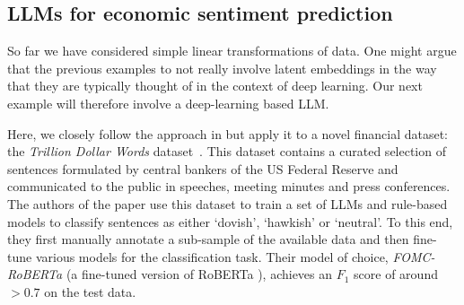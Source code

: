 \documentclass{article}
\theoremstyle{plain}
\theoremstyle{definition}
\theoremstyle{remark}
\begin{document}

% 

\subsection{LLMs for economic sentiment prediction}\label{ex-llm}

So far we have considered simple linear transformations of data. One might argue that the previous examples to not really involve latent embeddings in the way that they are typically thought of in the context of deep learning. Our next example will therefore involve a deep-learning based LLM.

Here, we closely follow the approach in \citet{gurnee2023languagev2} but apply it to a novel financial dataset: the \emph{Trillion Dollar Words} dataset~\cite{shah2023trillion}. This dataset contains a curated selection of sentences formulated by central bankers of the US Federal Reserve and communicated to the public in speeches, meeting minutes and press conferences. The authors of the paper use this dataset to train a set of LLMs and rule-based models to classify sentences as either `dovish', `hawkish' or `neutral'. To this end, they first manually annotate a sub-sample of the available data and then fine-tune various models for the classification task. Their model of choice, \emph{FOMC-RoBERTa} (a fine-tuned version of RoBERTa \citep{liu2019roberta}), achieves an \(F_1\) score of around \(>0.7\) on the test data. 
\end{document}

